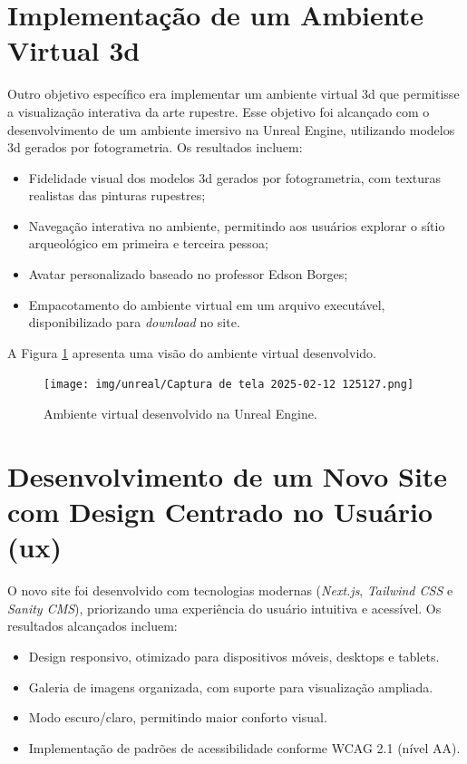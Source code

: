 \section{Implementação de um Ambiente Virtual \gls{3d}}
Outro objetivo específico era implementar um ambiente virtual \gls{3d} que permitisse a visualização interativa da arte rupestre. Esse objetivo foi alcançado com o desenvolvimento de um ambiente imersivo na Unreal Engine, utilizando modelos \gls{3d} gerados por fotogrametria. Os resultados incluem:
\begin{itemize}
    \item Fidelidade visual dos modelos \gls{3d} gerados por fotogrametria, com texturas realistas das pinturas rupestres;
    \item Navegação interativa no ambiente, permitindo aos usuários explorar o sítio arqueológico em primeira e terceira pessoa;
    \item Avatar personalizado baseado no professor Edson Borges;
    \item Empacotamento do ambiente virtual em um arquivo executável, disponibilizado para \textit{download} no site.
\end{itemize}

A Figura \ref{fig:virtual_environment} apresenta uma visão do ambiente virtual desenvolvido.

\begin{figure}[H]
    \centering
    \texttt{[image: img/unreal/Captura de tela 2025-02-12 125127.png]}
    \caption{Ambiente virtual desenvolvido na Unreal Engine.}
    \label{fig:virtual_environment}
\end{figure}

\section{Desenvolvimento de um Novo Site com Design Centrado no Usuário (\gls{ux})}
O novo site foi desenvolvido com tecnologias modernas (\textit{Next.js}, \textit{Tailwind CSS} e \textit{Sanity CMS}), priorizando uma experiência do usuário intuitiva e acessível. Os resultados alcançados incluem:
\begin{itemize}
    \item Design responsivo, otimizado para dispositivos móveis, desktops e tablets.
    \item Galeria de imagens organizada, com suporte para visualização ampliada.
    \item Modo escuro/claro, permitindo maior conforto visual.
    \item Implementação de padrões de acessibilidade conforme WCAG 2.1 (nível AA).
\end{itemize}

